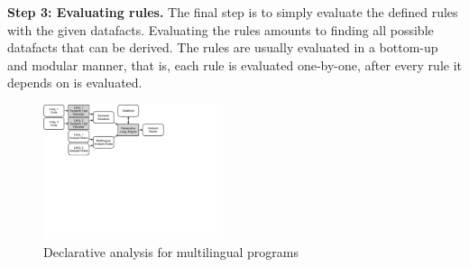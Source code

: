 




\medskip
\textbf{Step 3: Evaluating rules.}
The final step is to simply evaluate the defined rules with the given datafacts.
Evaluating the rules amounts to finding all possible
datafacts that can be derived. The rules are usually evaluated in a bottom-up
and modular manner, that is, each rule is evaluated one-by-one, after every
rule it depends on is evaluated.

\begin{figure}[t]
  \centering
  \vspace{2mm}
  \includegraphics[width=0.47\textwidth]{img/overview2.pdf}
  \caption{Declarative analysis for multilingual programs}
  \label{fig:overview2}
\end{figure}


